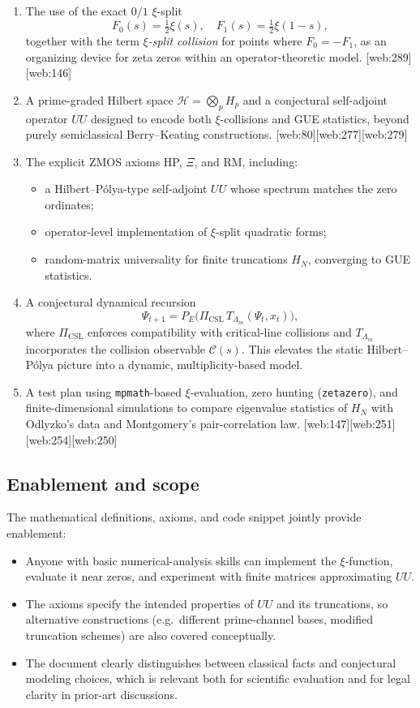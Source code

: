 \documentclass[11pt]{article}
\begin{document}
\begin{enumerate}
  \item The use of the exact $0/1$ $\xi$-split
  \[
    F_0(s)=\tfrac12\xi(s),\quad F_1(s)=\tfrac12\xi(1-s),
  \]
  together with the term \emph{$\xi$-split collision} for points where $F_0=-F_1$, as an organizing device for zeta zeros within an operator-theoretic model. [web:289][web:146]
  \item A prime-graded Hilbert space $\mathcal{H}=\bigotimes_p H_p$ and a conjectural self-adjoint operator $UU$ designed to encode both $\xi$-collisions and GUE statistics, beyond purely semiclassical Berry--Keating constructions. [web:80][web:277][web:279]
  \item The explicit ZMOS axioms HP, $\Xi$, and RM, including:
    \begin{itemize}
      \item a Hilbert--Pólya-type self-adjoint $UU$ whose spectrum matches the zero ordinates;
      \item operator-level implementation of $\xi$-split quadratic forms;
      \item random-matrix universality for finite truncations $H_N$, converging to GUE statistics.
    \end{itemize}
  \item A conjectural dynamical recursion
  \[
    \Psi_{t+1} = P_E\bigl(\Pi_{\mathrm{CSL}}\,T_{\Lambda_m}(\Psi_t,x_t)\bigr),
  \]
  where $\Pi_{\mathrm{CSL}}$ enforces compatibility with critical-line collisions and $T_{\Lambda_m}$ incorporates the collision observable $\mathcal{C}(s)$.  This elevates the static Hilbert--Pólya picture into a dynamic, multiplicity-based model.
  \item A test plan using \texttt{mpmath}-based $\xi$-evaluation, zero hunting (\texttt{zetazero}), and finite-dimensional simulations to compare eigenvalue statistics of $H_N$ with Odlyzko's data and Montgomery's pair-correlation law. [web:147][web:251][web:254][web:250]
\end{enumerate}

\subsection{Enablement and scope}

The mathematical definitions, axioms, and code snippet jointly provide enablement:
\begin{itemize}
  \item Anyone with basic numerical-analysis skills can implement the $\xi$-function, evaluate it near zeros, and experiment with finite matrices approximating $UU$.
  \item The axioms specify the intended properties of $UU$ and its truncations, so alternative constructions (e.g.\ different prime-channel bases, modified truncation schemes) are also covered conceptually.
  \item The document clearly distinguishes between classical facts and conjectural modeling choices, which is relevant both for scientific evaluation and for legal clarity in prior-art discussions.
\end{itemize}
\end{document}
